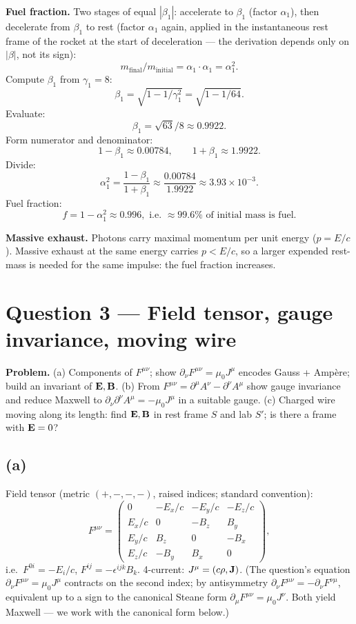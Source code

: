 \documentclass[11pt]{article}
\begin{document}
\textbf{Fuel fraction.} Two stages of equal $|\beta_1|$: accelerate to $\beta_1$ (factor $\alpha_1$), then decelerate from $\beta_1$ to rest (factor $\alpha_1$ again, applied in the instantaneous rest frame of the rocket at the start of deceleration --- the derivation depends only on $|\beta|$, not its sign):
\[ m_\text{final}/m_\text{initial} = \alpha_1\cdot\alpha_1 = \alpha_1^2. \]
Compute $\beta_1$ from $\gamma_1=8$:
\[ \beta_1 = \sqrt{1-1/\gamma_1^2} = \sqrt{1-1/64}. \]
Evaluate:
\[ \beta_1 = \sqrt{63}/8 \approx 0.9922. \]
Form numerator and denominator:
\[ 1-\beta_1 \approx 0.00784,\qquad 1+\beta_1 \approx 1.9922. \]
Divide:
\[ \alpha_1^2 = \frac{1-\beta_1}{1+\beta_1} \approx \frac{0.00784}{1.9922} \approx 3.93\times 10^{-3}. \]
Fuel fraction:
\[ \boxed{\;f = 1 - \alpha_1^2 \approx 0.996,\text{ i.e.\ }\approx 99.6\%\text{ of initial mass is fuel}.\;} \]

\textbf{Massive exhaust.} Photons carry maximal momentum per unit energy ($p=E/c$). Massive exhaust at the same energy carries $p<E/c$, so a larger expended rest-mass is needed for the same impulse: the fuel fraction increases.

\section*{Question 3 --- Field tensor, gauge invariance, moving wire}

\textbf{Problem.} (a) Components of $F^{\mu\nu}$; show $\partial_\nu F^{\mu\nu}=\mu_0 J^\mu$ encodes Gauss + Amp\`ere; build an invariant of $\vb E,\vb B$. (b) From $F^{\mu\nu}=\partial^\mu A^\nu-\partial^\nu A^\mu$ show gauge invariance and reduce Maxwell to $\partial_\nu\partial^\nu A^\mu=-\mu_0 J^\mu$ in a suitable gauge. (c) Charged wire moving along its length: find $\vb E,\vb B$ in rest frame $S$ and lab $S'$; is there a frame with $\vb E=0$?

\subsection*{(a)}

Field tensor (metric $(+,-,-,-)$, raised indices; standard convention):
\[ F^{\mu\nu} = \begin{pmatrix} 0 & -E_x/c & -E_y/c & -E_z/c \\ E_x/c & 0 & -B_z & B_y \\ E_y/c & B_z & 0 & -B_x \\ E_z/c & -B_y & B_x & 0 \end{pmatrix}, \]
i.e.\ $F^{0i} = -E_i/c$, $F^{ij} = -\epsilon^{ijk}B_k$. 4-current: $J^\mu=(c\rho,\vb J)$. (The question's equation $\partial_\nu F^{\mu\nu}=\mu_0 J^\mu$ contracts on the second index; by antisymmetry $\partial_\nu F^{\mu\nu} = -\partial_\nu F^{\nu\mu}$, equivalent up to a sign to the canonical Steane form $\partial_\mu F^{\mu\nu}=\mu_0 J^\nu$. Both yield Maxwell --- we work with the canonical form below.)
\end{document}
